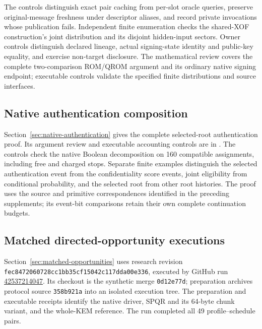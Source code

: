 \documentclass[pdflatex]{sn-jnl}
\theoremstyle{thmstyleone}
\theoremstyle{thmstylethree}
\theoremstyle{thmstyletwo}
\begin{document}
The controls distinguish exact pair caching from per-slot oracle queries,
preserve original-message freshness under descriptor aliases, and record
private invocations whose publication fails. Independent finite enumeration
checks the shared-XOF construction's joint distribution and its disjoint
hidden-input sectors. Owner controls distinguish declared lineage, actual
signing-state identity and public-key equality, and exercise non-target
disclosure. The mathematical review covers the complete two-comparison
ROM/QROM argument and its ordinary native signing endpoint; executable
controls validate the specified finite distributions and source interfaces.

\subsection{Native authentication composition}
\label{app:native-authentication}

Section~\ref{sec:native-authentication} gives the complete selected-root
authentication proof. Its argument review and executable accounting
controls are in .
The controls check the native Boolean decomposition on 160 compatible
assignments, including free and charged stops. Separate finite examples
distinguish the selected authentication event from the confidentiality
score events, joint eligibility from conditional probability, and the
selected root from other root histories. The proof uses the source and
primitive correspondences identified in the preceding supplements; its
event-bit comparisons retain their own complete continuation budgets.

\subsection{Matched directed-opportunity executions}
\label{app:matched-comparison}

Section~\ref{sec:matched-opportunities} uses research revision
\texttt{fec8472060728cc1bb35cf15042c117dda00e336}, executed by GitHub run
\href{https://github.com/billlza/q-periapt/actions/runs/42537214047}{42537214047}.
Its checkout is the synthetic merge \texttt{0d12e77d}; preparation archives
protocol source \texttt{358b921a} into an isolated execution tree. The
preparation and executable receipts identify the native driver, SPQR and its
64-byte chunk variant, and the whole-KEM reference. The run completed all
49 profile--schedule pairs.
\end{document}
